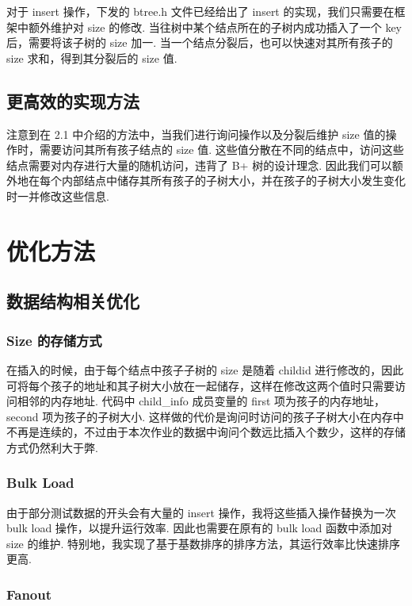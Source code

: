 \documentclass[10pt,letterpaper]{article}
\begin{document}
对于 insert 操作，下发的 btree.h 文件已经给出了 insert 的实现，我们只需要在框架中额外维护对 size 的修改. 当往树中某个结点所在的子树内成功插入了一个 key 后，需要将该子树的 size 加一. 当一个结点分裂后，也可以快速对其所有孩子的 size 求和，得到其分裂后的 size 值.

\subsection {更高效的实现方法}

注意到在 2.1 中介绍的方法中，当我们进行询问操作以及分裂后维护 size 值的操作时，需要访问其所有孩子结点的 size 值. 这些值分散在不同的结点中，访问这些结点需要对内存进行大量的随机访问，违背了 B+ 树的设计理念. 因此我们可以额外地在每个内部结点中储存其所有孩子的子树大小，并在孩子的子树大小发生变化时一并修改这些信息.

\section {优化方法}

\subsection {数据结构相关优化}

\subsubsection{Size 的存储方式}

在插入的时候，由于每个结点中孩子子树的 size 是随着 childid 进行修改的，因此可将每个孩子的地址和其子树大小放在一起储存，这样在修改这两个值时只需要访问相邻的内存地址. 代码中 child\_info 成员变量的 first 项为孩子的内存地址，second 项为孩子的子树大小. 这样做的代价是询问时访问的孩子子树大小在内存中不再是连续的，不过由于本次作业的数据中询问个数远比插入个数少，这样的存储方式仍然利大于弊.

\subsubsection{Bulk Load}

由于部分测试数据的开头会有大量的 insert 操作，我将这些插入操作替换为一次 bulk load 操作，以提升运行效率. 因此也需要在原有的 bulk load 函数中添加对 size 的维护. 特别地，我实现了基于基数排序的排序方法，其运行效率比快速排序更高.

\subsubsection{Fanout}
\end{document}
